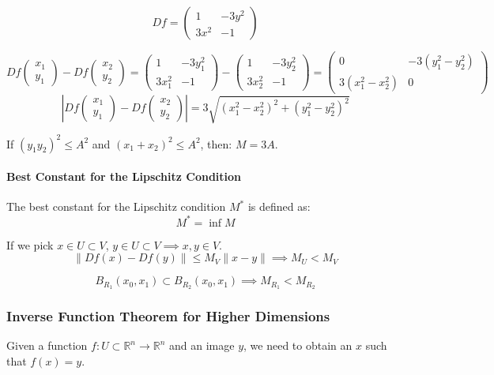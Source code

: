 \documentclass[11pt]{article}
\begin{document}
\[
Df = \begin{pmatrix}
    1 & -3y^2 \\
    3x^2 & -1
\end{pmatrix}
\]

\[
Df \begin{pmatrix}
    x_1 \\
    y_1
\end{pmatrix} - Df \begin{pmatrix}
    x_2 \\
    y_2
\end{pmatrix} = \begin{pmatrix}
    1 & -3y_1^2 \\
    3x_1^2 & -1
\end{pmatrix} - \begin{pmatrix}
    1 & -3y_2^2 \\
    3x_2^2 & -1
\end{pmatrix} = \begin{pmatrix}
    0 & -3(y_1^2 - y_2^2) \\
    3(x_1^2 - x_2^2) & 0
\end{pmatrix}
\]
\[
\left|Df \begin{pmatrix}
    x_1 \\
    y_1
\end{pmatrix} - Df \begin{pmatrix}
    x_2 \\
    y_2
\end{pmatrix}\right| = 3 \sqrt{(x_1^2 - x_2^2)^2 + (y_1^2 - y_2^2)^2}
\]

If $(y_1 y_2)^2 \leq A^2$ and $(x_1 + x_2)^2 \leq A^2$, then: $M = 3A$.

\paragraph{Best Constant for the Lipschitz Condition}
The best constant for the Lipschitz condition $M^*$ is defined as:
\[
M^* = \inf M
\]

If we pick $x \in U \subset V$, $y \in U \subset V \implies x,y \in V$.
\[
\| Df(x) - Df(y) \| \leq M_V \| x - y \| \implies M_U < M_V
\]

\[
B_{R_1}(x_0,x_1) \subset B_{R_2}(x_0,x_1) \implies M_{R_1} < M_{R_2}
\]

\subsubsection{Inverse Function Theorem for Higher Dimensions}
Given a function $f : U \subset \mathbb{R}^n \rightarrow \mathbb{R}^n$ and an image $y$, we need to obtain an $x$ such that $f(x) = y$.
\end{document}
